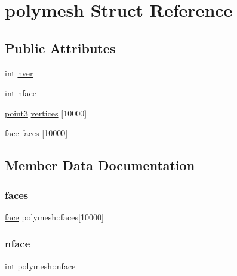 \hypertarget{structpolymesh}{}\section{polymesh Struct Reference}
\label{structpolymesh}
\subsection*{Public Attributes}
\begin{DoxyCompactItemize}
\item 
int \hyperlink{structpolymesh_a0f52cc433e6c22032311e9b4efab7a48}{nver}
\item 
int \hyperlink{structpolymesh_a6b2dcbe8e26a29762ca385fc9731e940}{nface}
\item 
\hyperlink{structpoint3}{point3} \hyperlink{structpolymesh_aca19ad588279843271d078618e536bd5}{vertices} \mbox{[}10000\mbox{]}
\item 
\hyperlink{structface}{face} \hyperlink{structpolymesh_a9898343865fe9807f786dfc1b6b288d6}{faces} \mbox{[}10000\mbox{]}
\end{DoxyCompactItemize}


\subsection{Member Data Documentation}
\hypertarget{structpolymesh_a9898343865fe9807f786dfc1b6b288d6}{}\label{structpolymesh_a9898343865fe9807f786dfc1b6b288d6} 
\subsubsection{\texorpdfstring{faces}{faces}}
{\footnotesize\ttfamily \hyperlink{structface}{face} polymesh\+::faces\mbox{[}10000\mbox{]}}

\hypertarget{structpolymesh_a6b2dcbe8e26a29762ca385fc9731e940}{}\label{structpolymesh_a6b2dcbe8e26a29762ca385fc9731e940} 
\subsubsection{\texorpdfstring{nface}{nface}}
{\footnotesize\ttfamily int polymesh\+::nface}

\hypertarget{structpolymesh_a0f52cc433e6c22032311e9b4efab7a48}{}\label{structpolymesh_a0f52cc433e6c22032311e9b4efab7a48} 
